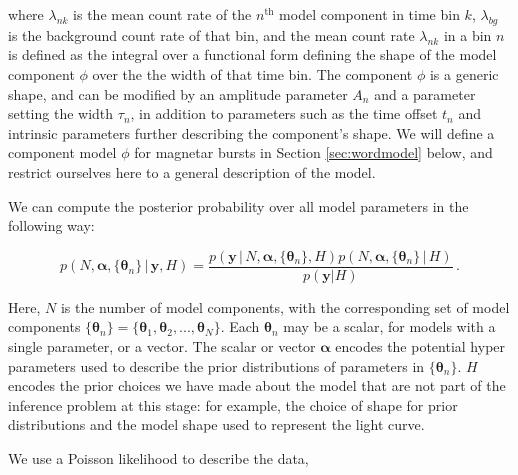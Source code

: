 \documentclass[12pt]{emulateapj}
\newcommand{\given}{\,|\,}
\newcommand{\counts}{y}
\newcommand{\pars}{\theta}
\newcommand{\mean}{\lambda}
\newcommand{\Poisson}{{\mathcal P}}
\newcommand{\bg}{\mathrm{bg}}
\newcommand{\word}{\phi}
\begin{document}
where $\mean_{nk}$ is the mean count rate of the $n^{\mathrm{th}}$ model component in time bin $k$, 
$\mean_{bg}$ is the background count rate of that bin,
and the mean count rate $\mean_{nk}$ in a bin $n$ is defined as the integral over a functional form defining the shape of
the model component $\word$ over the the width of that time bin. The component $\word$ is a generic shape,
and can be modified by an amplitude parameter $A_n$ and a parameter setting the width $\tau_n$, in addition to
parameters such as the time offset $t_n$ and intrinsic parameters further describing the component's shape.
We will define a component model $\word$ for magnetar bursts in Section \ref{sec:wordmodel} below, and
restrict ourselves here to a general description of the model.
 
  
We can compute the posterior probability over all model parameters in the following way:

\begin{equation}
p(N, \bm{\alpha},\{\bm{\theta}_n \} \given \bm{\counts}, H) = \frac{p(\bm{\counts} \given N, \bm{\alpha}, \{\bm{\theta}_n \}, H) p(N, \bm{\alpha}, \{\bm{\theta}_n \} \given H)}{p(\bm{\counts} | H)} \, .
\end{equation}

Here, $N$ is the number of model components, with the corresponding set of model components $\{\bm{\theta}_n\} = \{ \bm{\theta}_1, \bm{\theta}_2, ..., \bm{\theta}_N \}$. Each $\bm{\theta}_n$ may be a scalar, for models with a single parameter, or a vector.
The scalar or vector $\bm{\alpha}$ encodes the potential hyper parameters used to describe the prior distributions of parameters in $\{\bm{\theta}_n\}$. $H$ encodes the prior choices we have
made about the model that are not part of the inference problem at this stage: for example, the choice of shape for prior distributions and the model shape used to represent the light curve.

We use a Poisson likelihood to describe the data,
\end{document}
